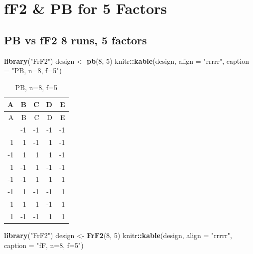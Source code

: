 \documentclass[
  12pt,
  a4paper,
]{article}
\newenvironment{Shaded}{\begin{snugshade}}{\end{snugshade}}
\newcommand{\AttributeTok}[1]{\textcolor[rgb]{0.13,0.29,0.53}{#1}}
\newcommand{\DecValTok}[1]{\textcolor[rgb]{0.00,0.00,0.81}{#1}}
\newcommand{\FunctionTok}[1]{\textcolor[rgb]{0.13,0.29,0.53}{\textbf{#1}}}
\newcommand{\NormalTok}[1]{#1}
\newcommand{\OtherTok}[1]{\textcolor[rgb]{0.56,0.35,0.01}{#1}}
\newcommand{\SpecialCharTok}[1]{\textcolor[rgb]{0.81,0.36,0.00}{\textbf{#1}}}
\newcommand{\StringTok}[1]{\textcolor[rgb]{0.31,0.60,0.02}{#1}}
\numberwithin{equation}{section}
\theoremstyle{plain}
\theoremstyle{definition}
\theoremstyle{remark}
\theoremstyle{note}
\begin{document}
\newpage

\hypertarget{ff2-pb-for-5-factors}{%
\section{fF2 \& PB for 5 Factors}\label{ff2-pb-for-5-factors}}

\hypertarget{pb-vs-ff2-8-runs-5-factors}{%
\subsection{PB vs fF2 8 runs, 5
factors}\label{pb-vs-ff2-8-runs-5-factors}}

\begin{Shaded}
\begin{Highlighting}[]
\FunctionTok{library}\NormalTok{(}\StringTok{"FrF2"}\NormalTok{)}
\NormalTok{design }\OtherTok{\textless{}{-}} \FunctionTok{pb}\NormalTok{(}\DecValTok{8}\NormalTok{, }\DecValTok{5}\NormalTok{)}
\NormalTok{knitr}\SpecialCharTok{::}\FunctionTok{kable}\NormalTok{(design, }\AttributeTok{align =} \StringTok{"rrrrr"}\NormalTok{, }\AttributeTok{caption =} \StringTok{"PB, n=8, f=5"}\NormalTok{)}
\end{Highlighting}
\end{Shaded}

\begin{longtable}[]{@{}rrrrr@{}}
\caption{PB, n=8, f=5}\tabularnewline
\toprule\noalign{}
A & B & C & D & E \\
\midrule\noalign{}
\endfirsthead
\toprule\noalign{}
A & B & C & D & E \\
\midrule\noalign{}
\endhead
\bottomrule\noalign{}
\endlastfoot
-1 & -1 & -1 & -1 & -1 \\
1 & 1 & -1 & 1 & -1 \\
-1 & 1 & 1 & 1 & -1 \\
1 & -1 & 1 & -1 & -1 \\
-1 & -1 & 1 & 1 & 1 \\
-1 & 1 & -1 & -1 & 1 \\
1 & 1 & 1 & -1 & 1 \\
1 & -1 & -1 & 1 & 1 \\
\end{longtable}

\begin{Shaded}
\begin{Highlighting}[]
\FunctionTok{library}\NormalTok{(}\StringTok{"FrF2"}\NormalTok{)}
\NormalTok{design }\OtherTok{\textless{}{-}} \FunctionTok{FrF2}\NormalTok{(}\DecValTok{8}\NormalTok{, }\DecValTok{5}\NormalTok{)}
\NormalTok{knitr}\SpecialCharTok{::}\FunctionTok{kable}\NormalTok{(design, }\AttributeTok{align =} \StringTok{"rrrrr"}\NormalTok{, }\AttributeTok{caption =} \StringTok{"fF, n=8, f=5"}\NormalTok{)}
\end{Highlighting}
\end{Shaded}
\end{document}
